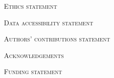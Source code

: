\documentclass[12pt,letterpaper]{article}
\renewcommand{\section}[1]{%
\bigskip
\begin{center}
\begin{Large}
\normalfont\scshape #1
\medskip
\end{Large}
\end{center}}
\begin{document}
\section{Ethics statement}
\section{Data accessibility statement}
\section{Authors’ contributions statement}
\section{Acknowledgements}
\section{Funding statement}

%
%




\end{document}
